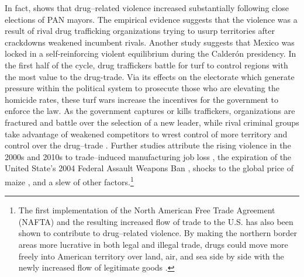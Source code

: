 \documentclass[12pt,letter,english,intoc,bibliography=totoc,index=totoc,BCOR10mm,captions=tableheading,nottitlepage,fleqn]{article}
\theoremstyle{break}
\begin{document}
In fact, \citet{dell2015} shows that drug--related violence increased substantially following close elections of PAN mayors. The empirical evidence suggests that the violence was a result of rival drug trafficking organizations trying to usurp territories after crackdowns weakened incumbent rivals. Another study suggests that Mexico was locked in a self-reinforcing violent equilibrium during the Calder\'{o}n presidency. In the first half of the cycle, drug traffickers battle for turf to control regions with the most value to the drug-trade. Via its effects on the electorate which generate pressure within the political system to prosecute those who are elevating the homicide rates, these turf wars increase the incentives for the government to enforce the law. As the government captures or kills traffickers, organizations are fractured and battle over the selection of a new leader, while rival criminal groups take advantage of weakened competitors to wrest control of more territory and control over the drug--trade \citep{rios2013}. Further studies attribute the rising violence in the 2000s and 2010s to trade--induced manufacturing job loss \citep{dell2019}, the expiration of the United State's 2004 Federal Assault Weapons Ban \citep{dube2013}, shocks to the global price of maize \citep{dube2016}, and a slew of other factors.\footnote{The first implementation of the North American Free Trade Agreement (NAFTA) and the resulting increased flow of trade to the U.S. has also been shown to contribute to drug--related violence. By making the northern border areas more lucrative in both legal and illegal trade, drugs could move more freely into American territory over land, air, and sea side by side with the newly increased flow of legitimate goods \citep{Calderon2013}.} 
\end{document}

